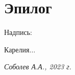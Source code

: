 {
\cleardoublepage
{}

\fancyhead[LE]{\fancyplain{}{}}
\fancyhead[RO]{\fancyplain{}{}}

\section*{Эпилог}
Надпись:

{\centering\Large{}}

Карелия$\ldots$


}
\vspace{5mm}
\begin{flushright}
\textit{Соболев А.А., 2023 г.}
\end{flushright}
